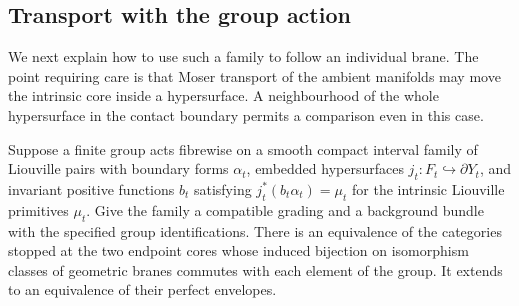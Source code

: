 \subsection{Transport with the group action}

We next explain how to use such a family to follow an individual brane. The point requiring care is that Moser transport of the ambient manifolds may move the intrinsic core inside a hypersurface. A neighbourhood of the whole hypersurface in the contact boundary permits a comparison even in this case.

\begin{lemma}\label{lem:geometrictransport}
Suppose a finite group acts fibrewise on a smooth compact interval family of Liouville pairs with boundary forms $\alpha_t$, embedded hypersurfaces $j_t:F_t\hookrightarrow\partial Y_t$, and invariant positive functions $b_t$ satisfying $j_t^*(b_t\alpha_t)=\mu_t$ for the intrinsic Liouville primitives $\mu_t$. Give the family a compatible grading and a background bundle with the specified group identifications. There is an equivalence of the categories stopped at the two endpoint cores whose induced bijection on isomorphism classes of geometric branes commutes with each element of the group. It extends to an equivalence of their perfect envelopes.
\end{lemma}

